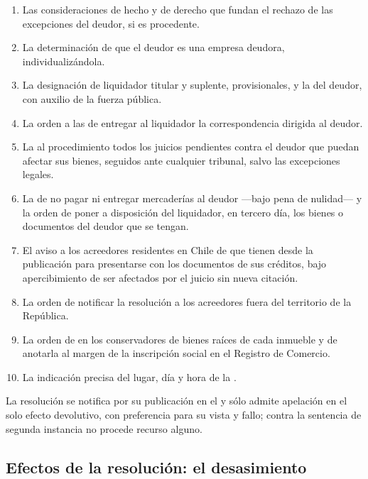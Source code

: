 \begin{enumerate}
  \item Las consideraciones de hecho y de derecho que fundan el rechazo de las excepciones
  del deudor, si es procedente.
  \item La determinación de que el deudor es una empresa deudora, individualizándola.
  \item La designación de liquidador titular y suplente, provisionales, y la
   del deudor, con auxilio de la fuerza pública.
  \item La orden a las  de entregar al liquidador la
  correspondencia dirigida al deudor.
  \item La  al procedimiento todos los juicios pendientes contra el
  deudor que puedan afectar sus bienes, seguidos ante cualquier tribunal, salvo las excepciones
  legales.
  \item La  de no pagar ni entregar mercaderías al deudor ---bajo
  pena de nulidad--- y la orden de poner a disposición del liquidador, en tercero día, los bienes
  o documentos del deudor que se tengan.
  \item El aviso a los acreedores residentes en Chile de que tienen  desde
  la publicación para presentarse con los documentos de sus créditos, bajo apercibimiento de ser
  afectados por el juicio sin nueva citación.
  \item La orden de notificar la resolución a los acreedores fuera del territorio de la República.
  \item La orden de  en los conservadores de bienes raíces de
  cada inmueble y de anotarla al margen de la inscripción social en el Registro de Comercio.
  \item La indicación precisa del lugar, día y hora de la .
\end{enumerate}

La resolución se notifica por su publicación en el \boletin{} y sólo admite apelación en el solo
efecto devolutivo, con preferencia para su vista y fallo; contra la sentencia de segunda instancia
no procede recurso alguno.

\subsection{Efectos de la resolución: el desasimiento}

